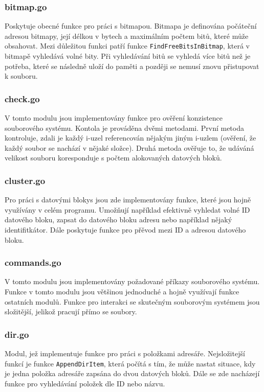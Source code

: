 \documentclass[12pt, a4paper]{article}
\begin{document}
			\subsubsection{bitmap.go}
			Poskytuje obecné funkce pro práci s bitmapou. Bitmapa je definována počáteční adresou bitmapy, její délkou v bytech a maximálním počtem bitů, které může obsahovat. Mezi důležitou funkci patří funkce \texttt{FindFreeBitsInBitmap}, která v bitmapě vyhledává volné bity. Při vyhledávání bitů se vyhledá více bitů než je potřeba, které se následně uloží do paměti a později se nemusí znovu přistupovat k souboru.
			\subsubsection{check.go}
			V tomto modulu jsou implementovány funkce pro ověření konzistence souborového systému. Kontola je prováděna dvěmi metodami. První metoda kontroluje, zdali je každý i-uzel referencován nějakým jiným i-uzlem (ověření, že každý soubor se nachází v nějaké složce). Druhá metoda ověřuje to, že udáváná velikost souboru koresponduje s počtem alokovaných datových bloků.

			\subsubsection{cluster.go}
			Pro práci s datovými blokys jsou zde implementovány funkce, které jsou hojně využívány v celém programu. Umožňují například efektivně vyhledat volné ID datového bloku, zapsat do datového bloku adresu nebo například nějaký identifitkátor. Dále poskytuje funkce pro přěvod mezi ID a adresou datového bloku.
			
			\subsubsection{commands.go}
			V tomto modulu jsou implementovány požadované příkazy souborového systému. Funkce v tomto modulu jsou většinou jednoduché a hojně využívají funkce ostatních modulů. Funkce pro interakci se skutečným souborovým systémem jsou složitější, jelikož pracují přímo se soubory.
						
			\subsubsection{dir.go}
			Modul, jež implementuje funkce pro práci s položkami adresáře. Nejsložitejší funkcí je funkce \texttt{AppendDirItem}, která počítá s tím, že může nastat situace, kdy je jedna položka adresáře zapsána do dvou datových bloků. Dále se zde nacházejí funkce pro vyhledávání položek dle ID nebo názvu.
									
\end{document}
